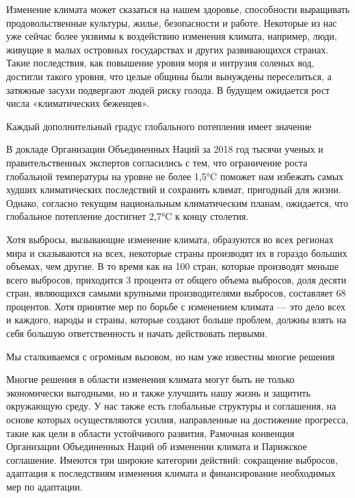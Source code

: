 Изменение климата может сказаться на нашем здоровье, способности выращивать продовольственные культуры, жилье, безопасности и работе. Некоторые из нас уже сейчас более уязвимы к воздействию изменения климата, например, люди, живущие в малых островных государствах и других развивающихся странах. Такие последствия, как повышение уровня моря и интрузия соленых вод, достигли такого уровня, что целые общины были вынуждены переселиться, а затяжные засухи подвергают людей риску голода. В будущем ожидается рост числа «климатических беженцев».

\begin{fancyquotes}
    Каждый дополнительный градус глобального потепления имеет значение
\end{fancyquotes}

В докладе Организации Объединенных Наций за 2018 год тысячи ученых и правительственных экспертов согласились с тем, что ограничение роста глобальной температуры на уровне не более 1,5°C поможет нам избежать самых худших климатических последствий и сохранить климат, пригодный для жизни. Однако, согласно текущим национальным климатическим планам, ожидается, что глобальное потепление достигнет 2,7°C к концу столетия.

Хотя выбросы, вызывающие изменение климата, образуются во всех регионах мира и сказываются на всех, некоторые страны производят их в гораздо больших объемах, чем другие. В то время как на 100 стран, которые производят меньше всего выбросов, приходится 3 процента от общего объема выбросов, доля десяти стран, являющихся самыми крупными производителями выбросов, составляет 68 процентов. Хотя принятие мер по борьбе с изменением климата — это дело всех и каждого, народы и страны, которые создают больше проблем, должны взять на себя большую ответственность и начать действовать первыми.

\begin{fancyquotes}
    Мы сталкиваемся с огромным вызовом, но нам уже известны многие решения
\end{fancyquotes}

Многие решения в области изменения климата могут быть не только экономически выгодными, но и также улучшить нашу жизнь и защитить окружающую среду. У нас также есть глобальные структуры и соглашения, на основе которых осуществляются усилия, направленные на достижение прогресса, такие как цели в области устойчивого развития, Рамочная конвенция Организации Объединенных Наций об изменении климата и Парижское соглашение. Имеются три широкие категории действий: сокращение выбросов, адаптация к последствиям изменения климата и финансирование необходимых мер по адаптации.

